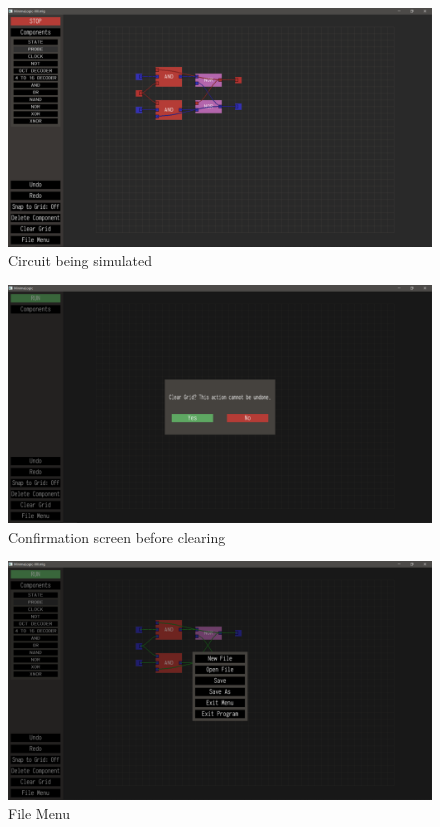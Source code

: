 \documentclass[report]{subfiles}
\begin{document}
\begin{figure}[H]
    \centering
    \includegraphics[width=\textwidth]{../graphics/jkff_simulating.png}
    \caption{Circuit being simulated}
\end{figure}
\begin{figure}[H]
    \centering
    \includegraphics[width=\textwidth]{../graphics/confirm_clear.png}
    \caption{Confirmation screen before clearing}
\end{figure}
\begin{figure}[H]
    \centering
    \includegraphics[width=\textwidth]{../graphics/file_menu.png}
    \caption{File Menu}
\end{figure}
\end{document}
